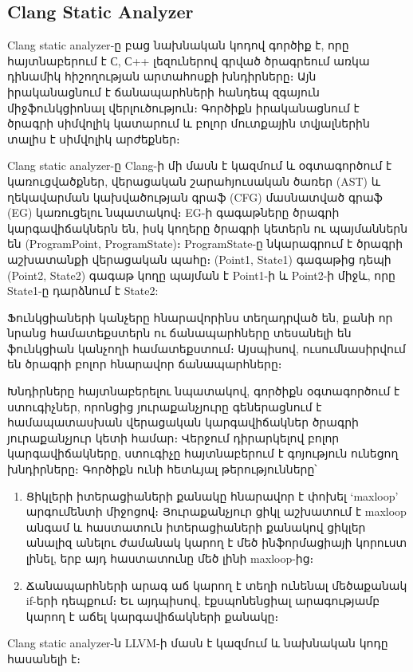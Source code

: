 \subsection{Clang Static Analyzer}
Clang static analyzer\cite{ClangAnalyzer}-ը բաց նախնական կոդով գործիք է, որը հայտնաբերում է С, С++ լեզուներով գրված
ծրագրեում առկա դինամիկ հիշողության արտահոսքի խնդիրները։ Այն իրականացնում է ճանապարհների հանդեպ զգայուն միջֆունկցիոնալ
վերլուծություն։ Գործիքն իրականացնում է ծրագրի սիմվոլիկ կատարում և բոլոր մուտքային տվյալներին տալիս է սիմվոլիկ արժեքներ։

Clang static analyzer-ը Clang\cite{Clang}-ի մի մասն է կազմում և օգտագործում է կառուցվածքներ, վերացական շարահյուսական
ծառեր (AST) և ղեկավարման կախվածության գրաֆ (CFG) մասնատված գրաֆ (EG) կառուցելու նպատակով։ EG-ի գագաթները ծրագրի
կարգավիճակներն են, իսկ կողերը ծրագրի կետերն ու պայմաններն են (ProgramPoint, ProgramState)։ ProgramState-ը նկարագրում է
ծրագրի աշխատանքի վերացական պահը։ (Point1, State1) գագաթից դեպի (Point2, State2) գագաթ կողը պայման է Point1-ի և Point2-ի
միջև, որը State1-ը դարձնում է State2:

Ֆունկցիաների կանչերը հնարավորինս տեղադրված են, քանի որ նրանց համատեքստերն ու ճանապարհները տեսանելի են ֆունկցիան կանչողի
համատեքստում։ Այսպիսով, ուսումնասիրվում են ծրագրի բոլոր հնարավոր ճանապարհները։

Խնդիրները հայտնաբերելու նպատակով, գործիքն օգտագործում է ստուգիչներ, որոնցից յուրաքանչյուրը գեներացնում է համապատասխան
վերացական կարգավիճակներ ծրագրի յուրաքանչյուր կետի համար։ Վերջում դիրարկելով բոլոր կարգավիճակները, ստուգիչը հայտնաբերում
է գոյություն ունեցող խնդիրները։ Գործիքն ունի հետևյալ թերությունները՝
\begin{enumerate}
    \item Ցիկլերի իտերացիաների քանակը հնարավոր է փոխել ‘maxloop’ արգումենտի միջոցով։ Յուրաքանչյուր ցիկլ աշխատում է
    maxloop անգամ և հաստատուն իտերացիաների քանակով ցիկլեր անալիզ անելու ժամանակ կարող է մեծ ինֆորմացիայի կորուստ լինել,
    երբ այդ հաստատունը մեծ լինի maxloop-ից։
    \item Ճանապարհների արագ աճ կարող է տեղի ունենալ մեծաքանակ if-երի դեպքում։ Եւ այդպիսով, էքսպոնենցիալ արագությամբ
    կարող է աճել կարգավիճակների քանակը։
\end{enumerate}

Clang static analyzer-ն LLVM-ի մասն է կազմում և նախնական կոդը հասանելի է\cite{LLVM}։
